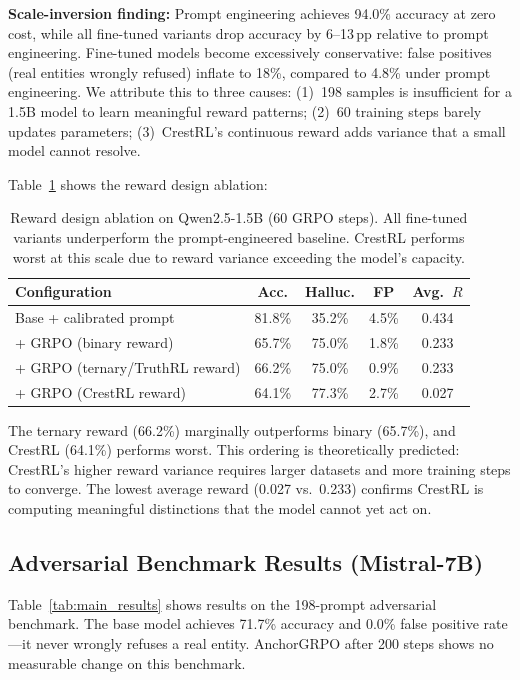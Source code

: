 \documentclass[11pt]{article}
\begin{document}
\textbf{Scale-inversion finding:} Prompt engineering achieves 94.0\% accuracy at zero cost, while all fine-tuned variants drop accuracy by 6--13\,pp relative to prompt engineering. Fine-tuned models become excessively conservative: false positives (real entities wrongly refused) inflate to 18\%, compared to 4.8\% under prompt engineering. We attribute this to three causes: (1)~198 samples is insufficient for a 1.5B model to learn meaningful reward patterns; (2)~60 training steps barely updates parameters; (3)~CrestRL's continuous reward adds variance that a small model cannot resolve.

Table~\ref{tab:ablation} shows the reward design ablation:

\begin{table}[t]
\centering
\caption{Reward design ablation on Qwen2.5-1.5B (60 GRPO steps). All fine-tuned variants underperform the prompt-engineered baseline. CrestRL performs worst at this scale due to reward variance exceeding the model's capacity.}
\label{tab:ablation}
\begin{tabular}{lcccc}
\toprule
\textbf{Configuration} & \textbf{Acc.} & \textbf{Halluc.} & \textbf{FP} & \textbf{Avg.\ $R$} \\
\midrule
Base + calibrated prompt & 81.8\% & 35.2\% & 4.5\% & 0.434 \\
+ GRPO (binary reward) & 65.7\% & 75.0\% & 1.8\% & 0.233 \\
+ GRPO (ternary/TruthRL reward) & 66.2\% & 75.0\% & 0.9\% & 0.233 \\
+ GRPO (CrestRL reward) & 64.1\% & 77.3\% & 2.7\% & 0.027 \\
\bottomrule
\end{tabular}
\end{table}

The ternary reward (66.2\%) marginally outperforms binary (65.7\%), and CrestRL (64.1\%) performs worst. This ordering is theoretically predicted: CrestRL's higher reward variance requires larger datasets and more training steps to converge. The lowest average reward (0.027 vs.\ 0.233) confirms CrestRL is computing meaningful distinctions that the model cannot yet act on.

\subsection{Adversarial Benchmark Results (Mistral-7B)}
\label{sec:adversarial}

Table~\ref{tab:main_results} shows results on the 198-prompt adversarial benchmark. The base model achieves 71.7\% accuracy and 0.0\% false positive rate---it never wrongly refuses a real entity. AnchorGRPO after 200 steps shows no measurable change on this benchmark.
\end{document}
